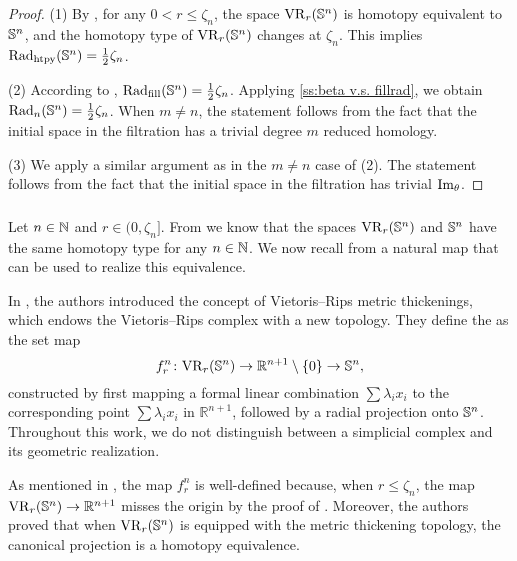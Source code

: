 \begin{proof}
	(1) By \cite[Thm.~7.1]{lim2024vietoris}, for any $0 < r \leq \zeta_n$, the space $\mathrm{VR}_r(\mathbb{S}^n)$ is homotopy equivalent to $\mathbb{S}^n$, and the homotopy type of $\mathrm{VR}_r(\mathbb{S}^n)$ changes at $\zeta_n$.
	This implies $\mathrm{Rad}_{\mathrm{htpy}}(\mathbb{S}^n)=\frac{1}{2}\zeta_n$.

	\smallskip (2) According to \cite{katz1983filling}, \(\mathrm{Rad}_{\mathrm{fill}}(\mathbb{S}^n) = \frac{1}{2}\zeta_n\).
	Applying \cref{ss:beta v.s. fillrad}, we obtain \(\mathrm{Rad}_{n}(\mathbb{S}^n) = \frac{1}{2}\zeta_n\).
	When $m\neq n$, the statement follows from the fact that the initial space in the filtration has a trivial degree $m$ reduced homology.

	\smallskip (3) We apply a similar argument as in the $m\neq n$ case of (2). The statement follows from the fact that the initial space in the filtration has trivial $\operatorname{Im}_\theta$.
\end{proof}

\subsubsection{}\label{ss:VRSn projection}

Let \(n \in \mathbb{N}\) and \(r \in (0, \zeta_n]\).
From \cite[Thm.~7.1]{lim2024vietoris} we know that the spaces \(\mathrm{VR}_r(\mathbb{S}^n)\) and \(\mathbb{S}^n\) have the same homotopy type for any \(n \in \mathbb{N}\).
We now recall from \cite{adamaszek2018metric} a natural map that can be used to realize this equivalence.

In \cite{adamaszek2018metric}, the authors introduced the concept of Vietoris–Rips metric thickenings, which endows the Vietoris–Rips complex with a new topology.
They define the  as the set map
\[
f_r^n \colon \mathrm{VR}_r(\mathbb{S}^n) \to \mathbb{R}^{n+1} \setminus \{0\} \to \mathbb{S}^n,
\]
constructed by first mapping a formal linear combination \(\sum \lambda_i x_i\) to the corresponding point \(\sum \lambda_i x_i\) in \(\mathbb{R}^{n+1}\), followed by a radial projection onto \(\mathbb{S}^n\).
Throughout this work, we do not distinguish between a simplicial complex and its geometric realization.

As mentioned in \cite{adamaszek2018metric}, the map $f_r^n$ is well-defined because, when $r \leq \zeta_n$, the map $\mathrm{VR}_r(\mathbb{S}^n) \to \mathbb{R}^{n+1}$ misses the origin by the proof of \cite[Lemma 3]{lovasz1983self}.
Moreover, the authors proved that when \(\mathrm{VR}_r(\mathbb{S}^n)\) is equipped with the metric thickening topology, the canonical projection is a homotopy equivalence.

